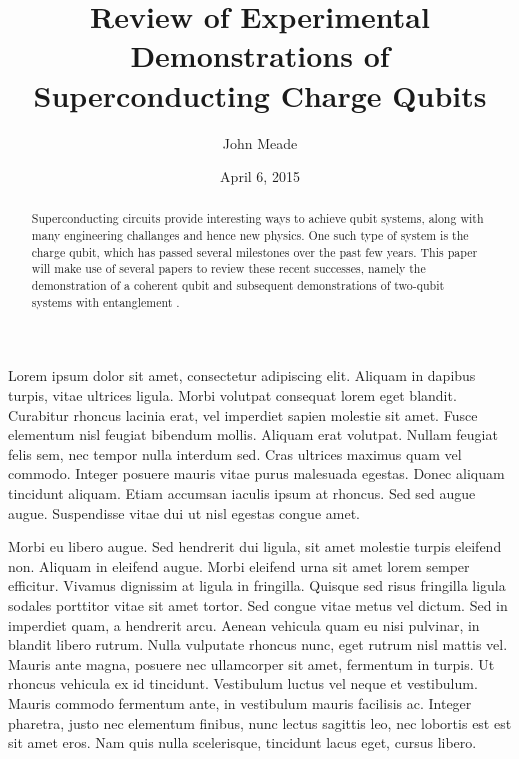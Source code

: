 \documentclass[12pt,letterpaper,notitlepage]{report}
\begin{document}
\title{Review of Experimental Demonstrations of Superconducting Charge Qubits}
\author{John Meade}
\date{April 6, 2015}

\maketitle

\begin{abstract}
\doublespacing
\noindent
Superconducting circuits provide interesting ways to achieve qubit systems, along with many engineering challanges and hence new physics. One such type of system is the charge qubit, which has passed several milestones over the past few years. This paper will make use of several papers to review these recent successes, namely the demonstration of a coherent qubit \cite{singleCooperPair} and subsequent demonstrations of two-qubit systems with entanglement \cite{twoPulseGates} \cite{onePulseGateNature} \cite{onePulseGatePhysica}.
\end{abstract}

\pagebreak
\doublespacing
Lorem ipsum dolor sit amet, consectetur adipiscing elit. Aliquam in dapibus turpis, vitae ultrices ligula. Morbi volutpat consequat lorem eget blandit. Curabitur rhoncus lacinia erat, vel imperdiet sapien molestie sit amet. Fusce elementum nisl feugiat bibendum mollis. Aliquam erat volutpat. Nullam feugiat felis sem, nec tempor nulla interdum sed. Cras ultrices maximus quam vel commodo. Integer posuere mauris vitae purus malesuada egestas. Donec aliquam tincidunt aliquam. Etiam accumsan iaculis ipsum at rhoncus. Sed sed augue augue. Suspendisse vitae dui ut nisl egestas congue amet.

Morbi eu libero augue. Sed hendrerit dui ligula, sit amet molestie turpis eleifend non. Aliquam in eleifend augue. Morbi eleifend urna sit amet lorem semper efficitur. Vivamus dignissim at ligula in fringilla. Quisque sed risus fringilla ligula sodales porttitor vitae sit amet tortor. Sed congue vitae metus vel dictum. Sed in imperdiet quam, a hendrerit arcu. Aenean vehicula quam eu nisi pulvinar, in blandit libero rutrum. Nulla vulputate rhoncus nunc, eget rutrum nisl mattis vel. Mauris ante magna, posuere nec ullamcorper sit amet, fermentum in turpis. Ut rhoncus vehicula ex id tincidunt. Vestibulum luctus vel neque et vestibulum. Mauris commodo fermentum ante, in vestibulum mauris facilisis ac. Integer pharetra, justo nec elementum finibus, nunc lectus sagittis leo, nec lobortis est est sit amet eros. Nam quis nulla scelerisque, tincidunt lacus eget, cursus libero.



\end{document}
